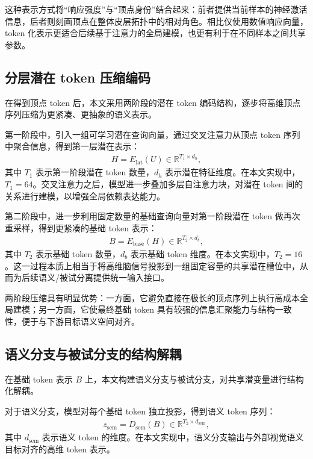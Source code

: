 这种表示方式将“响应强度”与“顶点身份”结合起来：前者提供当前样本的神经激活信息，后者则刻画顶点在整体皮层拓扑中的相对角色。相比仅使用数值响应向量，token 化表示更适合后续基于注意力的全局建模，也更有利于在不同样本之间共享参数。

\subsection{分层潜在 token 压缩编码}

在得到顶点 token 后，本文采用两阶段的潜在 token 编码结构，逐步将高维顶点序列压缩为更紧凑、更抽象的语义表示。

第一阶段中，引入一组可学习潜在查询向量，通过交叉注意力从顶点 token 序列中聚合信息，得到第一层潜在表示：
\begin{align}
  H = E_{\mathrm{lat}}(U) \in \mathbb{R}^{T_1 \times d_h},
\end{align}
其中 $T_1$ 表示第一阶段潜在 token 数量，$d_h$ 表示潜在特征维度。在本文实现中，$T_1=64$。交叉注意力之后，模型进一步叠加多层自注意力块，对潜在 token 间的关系进行建模，以增强全局依赖表达能力。

第二阶段中，进一步利用固定数量的基础查询向量对第一阶段潜在 token 做再次重采样，得到更紧凑的基础 token 表示：
\begin{align}
  B = E_{\mathrm{base}}(H) \in \mathbb{R}^{T_2 \times d_b},
\end{align}
其中 $T_2$ 表示基础 token 数量，$d_b$ 表示基础 token 维度。在本文实现中，$T_2=16$。这一过程本质上相当于将高维脑信号投影到一组固定容量的共享潜在槽位中，从而为后续语义/被试分离提供统一输入接口。

两阶段压缩具有明显优势：一方面，它避免直接在极长的顶点序列上执行高成本全局建模；另一方面，它使最终基础 token 具有较强的信息汇聚能力与结构一致性，便于与下游目标语义空间对齐。

\subsection{语义分支与被试分支的结构解耦}

在基础 token 表示 $B$ 上，本文构建语义分支与被试分支，对共享潜变量进行结构化解耦。

对于语义分支，模型对每个基础 token 独立投影，得到语义 token 序列：
\begin{align}
  z_{\mathrm{sem}} = D_{\mathrm{sem}}(B) \in \mathbb{R}^{T_2 \times d_{\mathrm{sem}}},
\end{align}
其中 $d_{\mathrm{sem}}$ 表示语义 token 的维度。在本文实现中，语义分支输出与外部视觉语义目标对齐的高维 token 表示。

